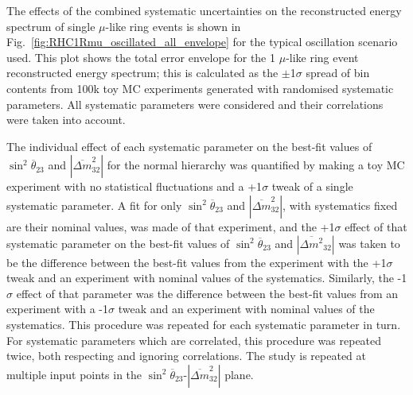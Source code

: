 The effects of the combined systematic uncertainties on the reconstructed energy spectrum of single $\mu$-like ring events
is shown in Fig.~\ref{fig:RHC1Rmu_oscillated_all_envelope} for the typical oscillation scenario used.
This plot shows the total error envelope for the 1 $\mu$-like ring event reconstructed energy spectrum; this is calculated
as the $\pm$1$\sigma$ spread of bin contents from 100k toy MC experiments generated with randomised systematic parameters.
All systematic parameters were considered and their correlations were taken
into account.




The individual effect of each systematic parameter on the best-fit values of $\sin^{2}\overline{\theta}_{23}$ and $|\overline{\Delta m}^2_{32}|$ 
for the normal hierarchy was quantified by making a toy MC experiment with no statistical fluctuations and a +1$\sigma$ tweak of a 
single systematic parameter. A fit for only $\sin^{2}\overline{\theta}_{23}$ and $|\overline{\Delta m}^2_{32}|$, with systematics fixed
are their nominal values,
was made of that experiment, and the +1$\sigma$ effect of that systematic parameter on the 
best-fit values of $\sin^{2}\overline{\theta}_{23}$ and $|\overline{\Delta m^2}_{32}|$ was taken to be the difference between the best-fit values from 
the experiment with the +1$\sigma$ tweak and an experiment with nominal values of the systematics. Similarly, the -1$\sigma$ effect of that 
parameter was the difference between the best-fit values from an experiment with a -1$\sigma$ tweak and an experiment with 
nominal values of the systematics. This procedure was repeated for each systematic parameter in turn.
For systematic parameters which are correlated, this procedure was repeated twice, both respecting and ignoring correlations.
The study is repeated at multiple input points in the $\sin^{2}\overline{\theta}_{23}$-$|\overline{\Delta m}^2_{32}|$ plane.

